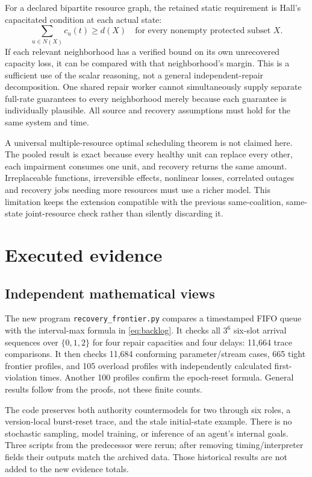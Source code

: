 For a declared bipartite resource graph, the retained static requirement is Hall's capacitated condition at each actual state:
\begin{equation}
 \sum_{u\in N(X)} c_u(t)\ge d(X)\quad\text{for every nonempty protected subset }X.
 \label{eq:hall}
\end{equation}
If each relevant neighborhood has a verified bound on its own unrecovered capacity loss, it can be compared with that neighborhood's margin. This is a sufficient use of the scalar reasoning, not a general independent-repair decomposition. One shared repair worker cannot simultaneously supply separate full-rate guarantees to every neighborhood merely because each guarantee is individually plausible. All source and recovery assumptions must hold for the same system and time.

A universal multiple-resource optimal scheduling theorem is not claimed here. The pooled result is exact because every healthy unit can replace every other, each impairment consumes one unit, and recovery returns the same amount. Irreplaceable functions, irreversible effects, nonlinear losses, correlated outages and recovery jobs needing more resources must use a richer model. This limitation keeps the extension compatible with the previous same-coalition, same-state joint-resource check rather than silently discarding it.

\section{Executed evidence}
\label{sec:experiments}
\subsection{Independent mathematical views}
The new program \texttt{recovery\_frontier.py} compares a timestamped FIFO queue with the interval-max formula in \cref{eq:backlog}. It checks all $3^6$ six-slot arrival sequences over $\{0,1,2\}$ for four repair capacities and four delays: 11,664 trace comparisons. It then checks 11,684 conforming parameter/stream cases, 665 tight frontier profiles, and 105 overload profiles with independently calculated first-violation times. Another 100 profiles confirm the epoch-reset formula. General results follow from the proofs, not these finite counts.

The code preserves both authority countermodels for two through six roles, a version-local burst-reset trace, and the stale initial-state example. There is no stochastic sampling, model training, or inference of an agent's internal goals. Three scripts from the predecessor were rerun; after removing timing/interpreter fields their outputs match the archived data. Those historical results are not added to the new evidence totals.

